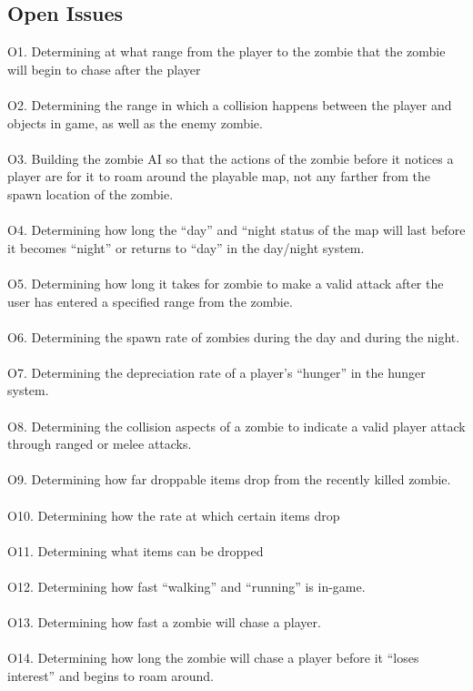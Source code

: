 \documentclass[12pt, titlepage]{article}
\begin{document}
\subsection{Open Issues}
{\color{magenta} O1.} Determining at what range from the player to the zombie that the zombie will begin to chase after the player
\\\\
{\color{magenta} O2.} Determining the range in which a collision happens between the player and objects in game, as well as the enemy zombie.
\\\\
{\color{magenta} O3.} Building the zombie AI so that the actions of the zombie before it notices a player are for it to roam around the playable map, not any farther from the spawn location of the zombie.
\\\\
{\color{magenta} O4.} Determining how long the “day” and “night status of the map will last before it becomes “night” or returns to “day” in the day/night system.
\\\\
{\color{magenta} O5.} Determining how long it takes for zombie to make a valid attack after the user has entered a specified range from the zombie.
\\\\
{\color{magenta} O6.} Determining the spawn rate of zombies during the day and during the night.
\\\\
{\color{magenta} O7.} Determining the depreciation rate of a player’s “hunger” in the hunger system.
\\\\
{\color{magenta} O8.} Determining the collision aspects of a zombie to indicate a valid player attack through ranged or melee attacks.
\\\\
{\color{magenta} O9.} Determining how far droppable items drop from the recently killed zombie.
\\\\
{\color{magenta} O10.} Determining how the rate at which certain items drop
\\\\
{\color{magenta} O11.} Determining what items can be dropped
\\\\
{\color{magenta} O12.} Determining how fast “walking” and “running” is in-game.
\\\\
{\color{magenta} O13.} Determining how fast a zombie will chase a player.
\\\\
{\color{magenta} O14.} Determining how long the zombie will chase a player before it “loses interest” and begins to roam around.
\end{document}
